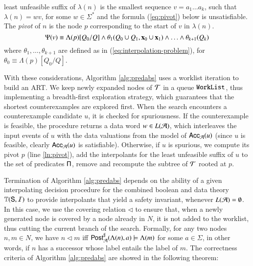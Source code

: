 \documentclass[10pt,conference,letterpaper,twocolumn]{IEEEtran}
\begin{document}
least unfeasible suffix of $\lambda(n)$ is the smallest sequence $v =
a_1 \ldots a_k$, such that $\lambda(n) = wv$, for some $w \in
\Sigma^*$ and the formula (\ref{eq:pivot}) below is unsatisfiable. The
\emph{pivot} of $n$ is the node $p$ corresponding to the start of $v$
in $\lambda(n)$.
\begin{equation}\label{eq:pivot}
  \pivot{v} \equiv \Lambda(p)[Q_0/Q] \wedge
  \theta_1(Q_0 \cup Q_1,\vec{x}_0 \cup \vec{x}_1) \wedge \ldots \wedge
  \theta_{k+1}(Q_k)
\end{equation}
where $\theta_1,\ldots,\theta_{k+1}$ are defined as in
(\ref{eq:interpolation-problem}), for $\theta_0 \equiv
\Lambda(p)[Q_0/Q]$. 

With these considerations, Algorithm \ref{alg:predabs} uses a worklist
iteration to build an ART. We keep newly expanded nodes of $\mathcal{T}$ in a
queue $\mathtt{WorkList}$, thus implementing a breadth-first exploration
strategy, which guarantees that the shortest counterexamples are
explored first. When the search encounters a counterexample candidate
$u$, it is checked for spuriousness. If the counterexample is
feasible, the procedure returns a data word $w \in L(\mathcal{A})$, which
interleaves the input events of $u$ with the data valuations from the
model of $\mathsf{Acc}_{\mathcal{A}}(u)$ (since $u$ is feasible, clearly
$\mathsf{Acc}_{\mathcal{A}}(u)$ is satisfiable). Otherwise, if $u$ is spurious, we
compute its pivot $p$ (line \ref{ln:pivot}), add the interpolants for
the least unfeasible suffix of $u$ to the set of predicates $\mathsf{\Pi}$,
remove and recompute the subtree of $\mathcal{T}$ rooted at $p$.

Termination of Algorithm \ref{alg:predabs} depends on the ability of a
given interpolating decision procedure for the combined boolean and
data theory $\mathbb{T}(\mathsf{S},\mathcal{I})$ to provide interpolants that yield a
safety invariant, whenever $L(\mathcal{A}) = \emptyset$. In this case, we
use the covering relation $\lhd$ to ensure that, when a newly
generated node is covered by a node already in $N$, it is not added to
the worklist, thus cutting the current branch of the search. Formally,
for any two nodes $n,m \in N$, we have $n \lhd m$ iff
${\mathsf{Post}}^\sharp_{\mathcal{A}}(\Lambda(n),a) \models \Lambda(m)$ for some $a \in
\Sigma$, in other words, if $n$ has a successor whose label entails
the label of $m$. The correctness criteria of Algorithm
\ref{alg:predabs} are showed in the following theorem:
\end{document}
